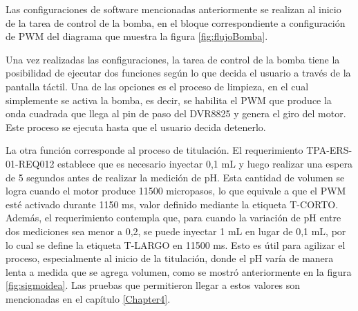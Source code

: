 Las configuraciones de software mencionadas anteriormente se realizan al inicio de la tarea de control de la bomba, en el bloque correspondiente a configuración de PWM del diagrama que muestra la figura \ref{fig:flujoBomba}.

Una vez realizadas las configuraciones, la tarea de control de la bomba tiene la posibilidad de ejecutar dos funciones según lo que decida el usuario a través de la pantalla táctil. Una de las opciones es el proceso de limpieza, en el cual simplemente se activa la bomba, es decir, se habilita el PWM que produce la onda cuadrada que llega al pin de paso del DVR8825 y genera el giro del motor. Este proceso se ejecuta hasta que el usuario decida detenerlo.

La otra función corresponde al proceso de titulación. El requerimiento TPA-ERS-01-REQ012 establece que es necesario inyectar 0,1 mL y luego realizar una espera de 5 segundos antes de realizar la medición de pH. Esta cantidad de volumen se logra cuando el motor produce 11500 micropasos, lo que equivale a que el PWM esté activado durante 1150 ms, valor definido mediante la etiqueta T-CORTO. Además, el requerimiento contempla que, para cuando la variación de pH entre dos mediciones  sea menor a 0,2, se puede inyectar 1 mL en lugar de 0,1 mL, por lo cual se define la etiqueta T-LARGO en 11500 ms. Esto es útil para agilizar el proceso, especialmente al inicio de la titulación, donde el pH varía de manera lenta a medida que se agrega volumen, como se mostró anteriormente en la figura \ref{fig:sigmoidea}. Las pruebas que permitieron llegar a estos valores son mencionadas en el capítulo \ref{Chapter4}.

